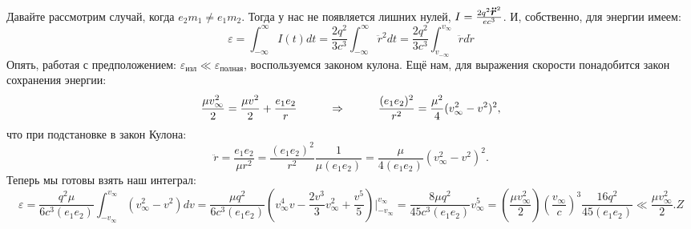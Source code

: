 Давайте рассмотрим случай, когда $e_2 m_1 \neq e_1 m_2$. Тогда у нас не появляется лишних нулей, $I = \frac{ 2 q^2 \mbox{\boldmath $\ddot{r}$}^2}{e c^3}$. И, собственно, для энергии имеем:
\begin{equation*}
	\varepsilon = \int_{-\infty}^{\infty} I(t) dt = \frac{2 q^2}{3 c^3} \int_{-\infty}^{\infty} \ddot{r}^2 d t
	=
	\frac{2 q^2}{3 c^3} \int_{v_{-\infty}}^{v_{\infty}} \ddot{r} d \dot{r}
\end{equation*}
Опять, работая с предположением: $\varepsilon_{\text{изл}}\ll \varepsilon_{\text{полная}}$, воспользуемся законом кулона. Ещё нам, для выражения скорости понадобится закон сохранения энергии:
\begin{equation*}
	\frac{\mu v^2_\infty}{2} = \frac{\mu v^2}{2} + \frac{e_1 e_2}{r}
	\hspace{1 cm}
	\Rightarrow
	\hspace{1 cm}
	\frac{(e_1 e_2)^2}{r^2} = \frac{\mu^2}{4} (v_\infty^2 - v^2)^2,
\end{equation*}
что при подстановке в закон Кулона:
\begin{equation*}
	\ddot{r} = \frac{e_1 e_2}{\mu r^2} = \frac{(e_1 e_2)^2}{r^2} \frac{1}{\mu (e_1 e_2)}
	=
	\frac{\mu}{4 (e_1 e_2)} (v_\infty^2 - v^2)^2.
\end{equation*}
Теперь мы готовы взять наш интеграл:
\begin{equation*}
	\varepsilon = \frac{q^2 \mu}{6 c^3 (e_1 e_2)} \int_{- v_\infty}^{v_\infty} (v_\infty^2 - v^2) d v
	=
	\frac{\mu q^2}{6 c^3 (e_1 e_2)} \left(v_\infty^4 v - \frac{2 v^{3}}{3} v_\infty^2 + \frac{v^5}{5}\right) \bigg|_{-v_\infty}^{v_\infty}
	=
	\frac{8 \mu q^2}{45 c^3 (e_1 e_2)} v_\infty^5
	=
	\left(\frac{\mu v_\infty^2}{2}\right) \left(\frac{v_\infty}{c}\right)^3 \frac{16 q^2}{45 (e_1 e_2)}
	\ll \frac{\mu v_\infty^2}{2}.Z
\end{equation*}